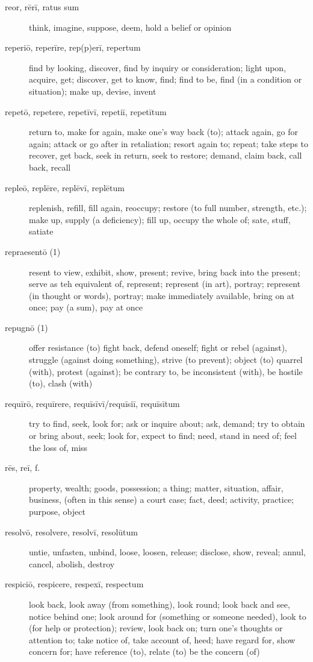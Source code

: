 \begin{description}
    \item[reor, rērī, ratus sum] \marginnote{*}think, imagine, suppose, deem, hold a belief or opinion
    \item[reperiō, reperīre, rep(p)erī, repertum] \marginnote{*}find by looking, discover, find by inquiry or consideration; light upon, acquire, get; discover, get to know, find; find to be, find (in a condition or situation); make up, devise, invent
    \item[repetō, repetere, repetīvī, repetiī, repetītum] \marginnote{*}return to, make for again, make one's way back (to); attack again, go for again; attack or go after in retaliation; resort again to; repeat; take steps to recover, get back, seek in return, seek to restore; demand, claim back, call back, recall
    \item[repleō, replēre, replēvī, replētum] replenish, refill, fill again, reoccupy; restore (to full number, strength, etc.); make up, supply (a deficiency); fill up, occupy the whole of; sate, stuff, satiate
    \item[repraesentō (1)] resent to view, exhibit, show, present; revive, bring back into the present; serve as teh equivalent of, represent; represent (in art), portray; represent (in thought or words), portray; make immediately available, bring on at once; pay (a sum), pay at once
    \item[repugnō (1)] offer resistance (to) fight back, defend oneself; fight or rebel (against), struggle (against doing something), strive (to prevent); object (to) quarrel (with), protest (against); be contrary to, be inconsistent (with), be hostile (to), clash (with)
    \item[requīrō, requīrere, requīsīvī/requīsiī, requīsītum] try to find, seek, look for; ask or inquire about; ask, demand; try to obtain or bring about, seek; look for, expect to find; need, stand in need of; feel the loss of, miss
    \item[rēs, reī, f.] \marginnote{*}property, wealth; goods, possession; a thing; matter, situation, affair, business, (often in this sense) a court case; fact, deed; activity, practice; purpose, object
    \item[resolvō, resolvere, resolvī, resolūtum] untie, unfasten, unbind, loose, loosen, release; disclose, show, reveal; annul, cancel, abolish, destroy
    \item[respiciō, respicere, respexī, respectum] \marginnote{*}look back, look away (from something), look round; look back and see, notice behind one; look around for (something or someone needed), look to (for help or protection); review, look back on; turn one's thoughts or attention to; take notice of, take account of, heed; have regard for, show concern for; have reference (to), relate (to) be the concern (of)

\end{description}
